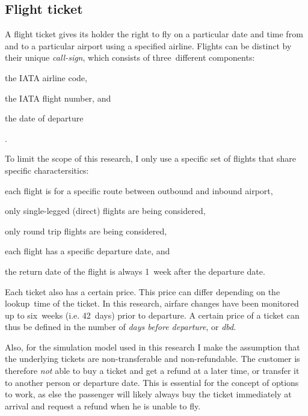 \subsection{Flight ticket}
\label{subsec:FlightTicket}
A flight ticket gives its holder the right to fly on a particular date and time from and to a particular airport using a specified airline. Flights can be distinct by their unique \emph{call-sign}, which consists of three~different components: \begin{inparaenum}
\item the IATA airline code,
\item the IATA flight number, and
\item the date of departure
\end{inparaenum}.

To limit the scope of this research, I only use a specific set of flights that share specific charactersitics:

\begin{compactitem}
\item each flight is for a specific route between outbound and inbound airport,
\item only single-legged (direct) flights are being considered,
\item only round trip flights are being considered,
\item each flight has a specific departure date, and
\item the return date of the flight is always 1~week after the departure date.
\end{compactitem}
\vspace{1em}

Each ticket also has a certain price. This price can differ depending on the lookup~time of the ticket. In this research, airfare changes have been monitored up to six~weeks (i.e. 42~days) prior to departure. A certain price of a ticket can thus be defined in the number of \emph{days before departure}, or \emph{dbd}.

Also, for the simulation model used in this research I make the assumption that the underlying tickets are non-transferable and non-refundable. The customer is therefore \emph{not} able to buy a ticket and get a refund at a later time, or transfer it to another person or departure date. This is essential for the concept of options to work, as else the passenger will likely always buy the ticket immediately at arrival and request a refund when he is unable to fly.

